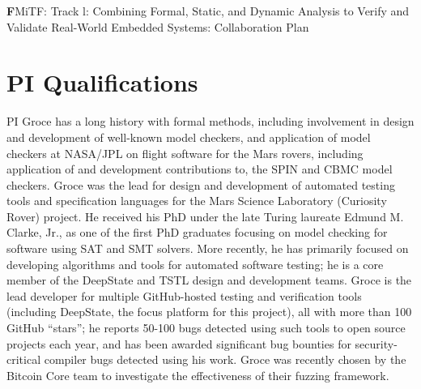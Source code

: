\documentclass[12pt]{article}
\begin{document}

\begin{center}
{\Large \sf\textbf FMiTF: Track l: Combining Formal, Static, and
  Dynamic Analysis to Verify and Validate Real-World Embedded Systems: Collaboration Plan}
\end{center}

\section{PI Qualifications}

PI Groce has a long history with formal methods, including involvement in design and development of well-known model checkers, and application of model checkers at NASA/JPL on flight software for the Mars rovers, including application of and development contributions to, the SPIN and CBMC model checkers.  Groce was the lead for design and development of automated testing tools and specification languages for the Mars Science Laboratory (Curiosity Rover) project.  He received his PhD under the late Turing laureate Edmund M. Clarke, Jr., as one of the first PhD graduates focusing on model checking for software using SAT and SMT solvers.  More recently, he has primarily focused on developing algorithms and tools for automated software testing; he is a core member of the DeepState and TSTL design and development teams.  Groce is the lead developer for multiple GitHub-hosted testing and verification tools (including DeepState, the focus platform for this project), all with more than 100 GitHub ``stars''; he reports 50-100 bugs detected using such tools to open source projects each year, and has been awarded significant bug bounties for security-critical compiler bugs detected using his work.  Groce was recently chosen by the Bitcoin Core team to investigate the effectiveness of their fuzzing framework.
\end{document}
